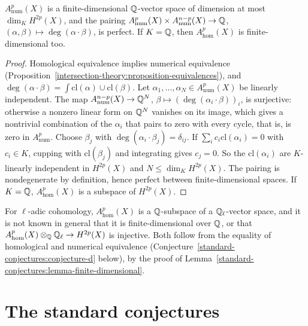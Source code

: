 \begin{lemma}\label{standard-conjectures:lemma-finite-dimensional}
$A^p_{\mathrm{num}}(X)$ is a finite-dimensional $\mathbb{Q}$-vector space of dimension at most $\dim_KH^{2p}(X)$, and the pairing $A^p_{\mathrm{num}}(X) \times A^{n-p}_{\mathrm{num}}(X) \to \mathbb{Q}$,
$(\alpha, \beta) \mapsto \deg(\alpha \cdot \beta)$, is perfect. If $K = \mathbb{Q}$, then $A^p_{\mathrm{hom}}(X)$ is finite-dimensional too.
\end{lemma}

\begin{proof}
Homological equivalence implies numerical equivalence (Proposition~\ref{intersection-theory:proposition-equivalences}), and $\deg(\alpha \cdot \beta) = \int\mathrm{cl}(\alpha) \cup \mathrm{cl}(\beta)$. Let
$\alpha_1, \ldots, \alpha_N \in A^p_{\mathrm{num}}(X)$ be linearly independent. The map $A^{n-p}_{\mathrm{num}}(X) \to \mathbb{Q}^N$, $\beta \mapsto (\deg(\alpha_i \cdot \beta))_i$, is surjective: otherwise a nonzero linear form on $\mathbb{Q}^N$
vanishes on its image, which gives a nontrivial combination of the $\alpha_i$ that pairs to zero with every cycle, that is, is zero in $A^p_{\mathrm{num}}$. Choose $\beta_j$ with $\deg(\alpha_i \cdot \beta_j) = \delta_{ij}$. If
$\sum_ic_i\mathrm{cl}(\alpha_i) = 0$ with $c_i \in K$, cupping with $\mathrm{cl}(\beta_j)$ and integrating gives $c_j = 0$. So the $\mathrm{cl}(\alpha_i)$ are $K$-linearly independent in $H^{2p}(X)$ and
$N \leq \dim_KH^{2p}(X)$. The pairing is nondegenerate by definition, hence perfect between finite-dimensional spaces. If $K = \mathbb{Q}$, $A^p_{\mathrm{hom}}(X)$ is a subspace of $H^{2p}(X)$.
\end{proof}

\begin{remark}\label{standard-conjectures:remark-hom-finite}
For $\ell$-adic cohomology, $A^p_{\mathrm{hom}}(X)$ is a $\mathbb{Q}$-subspace of a $\mathbb{Q}_\ell$-vector space, and it is not known in general that it is finite-dimensional over $\mathbb{Q}$, or that
$A^p_{\mathrm{hom}}(X) \otimes_{\mathbb{Q}}\mathbb{Q}_\ell \to H^{2p}(X)$ is injective. Both follow from the equality of homological and numerical equivalence (Conjecture~\ref{standard-conjectures:conjecture-d} below), by the
proof of Lemma~\ref{standard-conjectures:lemma-finite-dimensional}.
\end{remark}

\section{The standard conjectures}\label{standard-conjectures:section-conjectures}

